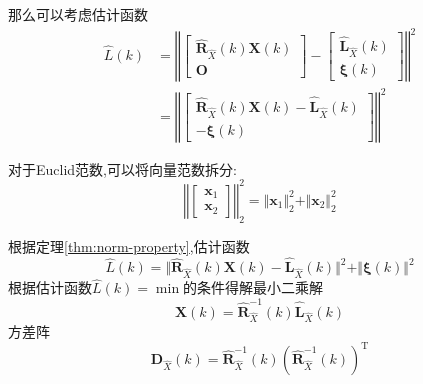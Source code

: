 \documentclass[cn,10pt,citestyle=gb7714-2015,bibstyle=gb7714-2015]{elegantbook}
\newcommand{\mT}{\mathrm{T}}
\begin{document}
那么可以考虑估计函数
\begin{align*}
  \hat{{L}}(k)&=\left\Vert\begin{bmatrix}
    \hat{\bm{R}}_{\hat{X}}(k)\bm{X}(k)\\
    \bm{O}
  \end{bmatrix}-\begin{bmatrix}
    \hat{\bm{L}}_{\hat{X}}(k)\\
    \bm{\xi}(k)
  \end{bmatrix}\right\Vert^2\\
  &=\left\Vert\begin{bmatrix}
    \hat{\bm{R}}_{\hat{X}}(k)\bm{X}(k)-\hat{\bm{L}}_{\hat{X}}(k)\\
    -\bm{\xi}(k)
  \end{bmatrix}\right\Vert^2
\end{align*}
\begin{theorem}[向量范数的一个重要性质]\label{thm:norm-property}
  对于Euclid范数,可以将向量范数拆分:
  \begin{equation}
    \left\Vert\begin{bmatrix}
      \bm{x}_1\\
      \bm{x}_2
    \end{bmatrix}\right\Vert_2^2=\Vert\bm{x}_1\Vert_2^2+\Vert\bm{x}_2\Vert_2^2
  \end{equation}
\end{theorem}
根据定理\ref{thm:norm-property},估计函数
\begin{equation}
  \hat{{L}}(k)=\Vert\hat{\bm{R}}_{\hat{X}}(k)\bm{X}(k)-\hat{\bm{L}}_{\hat{X}}(k)\Vert^2+\Vert\bm{\xi}(k)\Vert^2
\end{equation}
根据估计函数$\hat{{L}}(k)=\min$的条件得解最小二乘解
\begin{equation}
  \hat{\bm{X}}(k)=\hat{\bm{R}}_{\hat{X}}^{-1}(k)\hat{\bm{L}}_{\hat{X}}(k)
\end{equation}
方差阵
\begin{equation}
  \bm{D}_{\hat{X}}(k)=\hat{\bm{R}}_{\hat{X}}^{-1}(k)\left(\hat{\bm{R}}_{\hat{X}}^{-1}(k)\right)^\mT
\end{equation}
\end{document}
